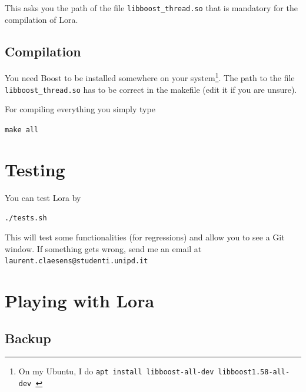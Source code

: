 \documentclass[a4paper,12pt]{article}
\newcommand{\info}[1]{\texttt{#1}}
\begin{document}
This asks you the path of the file \info{libboost\_thread.so} that is mandatory for the compilation of Lora.

\subsection{Compilation}

You need Boost to be installed somewhere on your system\footnote{On my Ubuntu, I do \info{apt install libboost-all-dev  libboost1.58-all-dev }}. The path to the file \info{libboost\_thread.so} has to be correct in the makefile (edit it if you are unsure).

For compiling everything you simply type
\begin{center}
    \info{make all}
\end{center}

\section{Testing}

You can test Lora by
\begin{center}
    \info{./tests.sh}
\end{center}
This will test some functionalities (for regressions) and allow you to see a Git window. If something gets wrong, send me an email at \info{laurent.claesens@studenti.unipd.it}

\section{Playing with Lora}

\subsection{Backup}
\end{document}
